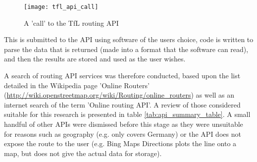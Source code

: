 \begin{figure}[H]
\centering
\texttt{[image: tfl\_api\_call]}
\caption{A 'call' to the TfL routing API}
\label{fig:tfl_api_call}
\end{figure}

This is submitted to the API using software of the users choice, code is written to parse the data that is returned (made into a format that the software can read), and then the results are stored and used as the user wishes.

A search of routing API services was therefore conducted, based upon the list detailed in the Wikipedia page 'Online Routers' (\url{http://wiki.openstreetmap.org/wiki/Routing/online_routers}) as well as an internet search of the term 'Online routing API'. A review of those considered suitable for this research is presented in table \ref{tab:api_summary_table}. A small handful of other APIs were dismissed before this stage as they were unsuitable for reasons such as geography (e.g. only covers Germany) or the API does not expose the route to the user (e.g. Bing Maps Directions plots the line onto a map, but does not give the actual data for storage).

